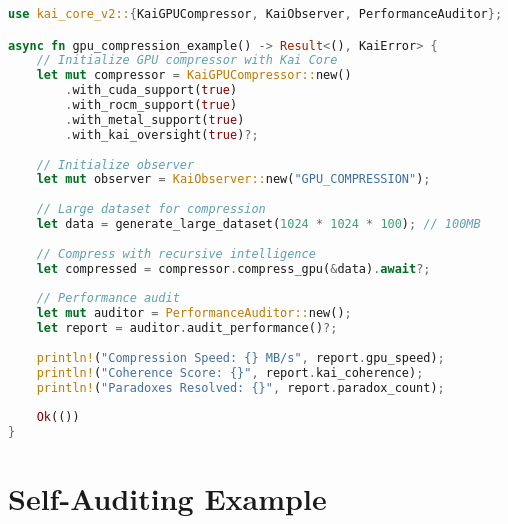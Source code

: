 \documentclass[11pt]{report}
\newcommand{\codebox}[2]{
  \begin{tcolorbox}[
    colback=gray!5,
    colframe=kai_blue,
    title=#1,
    fonttitle=\bfseries
  ]
  #2
  \end{tcolorbox}
}
\begin{document}
\codebox{GPU Acceleration with Kai Core}{
\begin{lstlisting}[language=rust]
use kai_core_v2::{KaiGPUCompressor, KaiObserver, PerformanceAuditor};

async fn gpu_compression_example() -> Result<(), KaiError> {
    // Initialize GPU compressor with Kai Core
    let mut compressor = KaiGPUCompressor::new()
        .with_cuda_support(true)
        .with_rocm_support(true)
        .with_metal_support(true)
        .with_kai_oversight(true)?;
    
    // Initialize observer
    let mut observer = KaiObserver::new("GPU_COMPRESSION");
    
    // Large dataset for compression
    let data = generate_large_dataset(1024 * 1024 * 100); // 100MB
    
    // Compress with recursive intelligence
    let compressed = compressor.compress_gpu(&data).await?;
    
    // Performance audit
    let mut auditor = PerformanceAuditor::new();
    let report = auditor.audit_performance()?;
    
    println!("Compression Speed: {} MB/s", report.gpu_speed);
    println!("Coherence Score: {}", report.kai_coherence);
    println!("Paradoxes Resolved: {}", report.paradox_count);
    
    Ok(())
}
\end{lstlisting}
}

\section{Self-Auditing Example}
\end{document}
